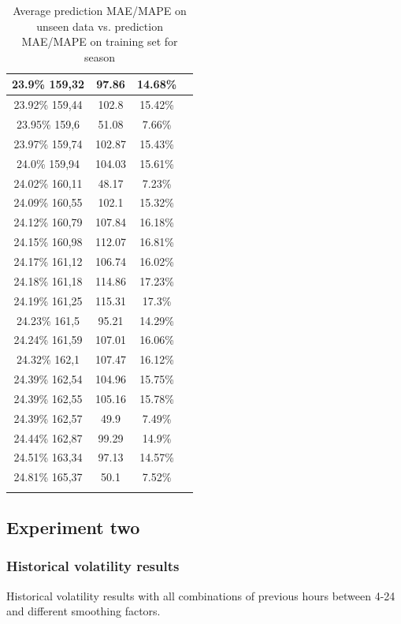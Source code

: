 \begin{center}
\begin{longtable}{|c|c|c|c|}
23.9\% 159,32 & 97.86 & 14.68\%  \\ \hline
23.92\% 159,44 & 102.8 & 15.42\%  \\ \hline
23.95\% 159,6 & 51.08 & 7.66\%  \\ \hline
23.97\% 159,74 & 102.87 & 15.43\%  \\ \hline
24.0\% 159,94 & 104.03 & 15.61\%  \\ \hline
24.02\% 160,11 & 48.17 & 7.23\%  \\ \hline
24.09\% 160,55 & 102.1 & 15.32\%  \\ \hline
24.12\% 160,79 & 107.84 & 16.18\%  \\ \hline
24.15\% 160,98 & 112.07 & 16.81\%  \\ \hline
24.17\% 161,12 & 106.74 & 16.02\%  \\ \hline
24.18\% 161,18 & 114.86 & 17.23\%  \\ \hline
24.19\% 161,25 & 115.31 & 17.3\%  \\ \hline
24.23\% 161,5 & 95.21 & 14.29\%  \\ \hline
24.24\% 161,59 & 107.01 & 16.06\%  \\ \hline
24.32\% 162,1 & 107.47 & 16.12\%  \\ \hline
24.39\% 162,54 & 104.96 & 15.75\%  \\ \hline
24.39\% 162,55 & 105.16 & 15.78\%  \\ \hline
24.39\% 162,57 & 49.9 & 7.49\%  \\ \hline
24.44\% 162,87 & 99.29 & 14.9\%  \\ \hline
24.51\% 163,34 & 97.13 & 14.57\%  \\ \hline
24.81\% 165,37 & 50.1 & 7.52\%  \\ \hline
\caption{Average prediction MAE/MAPE on unseen data vs. prediction MAE/MAPE on training set for season}
\label{table:predictionMAEUnseenVsTrainingSetSeasonAppendix}
\end{longtable}
\end{center}
\normalsize
\subsection{Experiment two}

\subsubsection{Historical volatility results}
\label{sec:historicalVolatiltiyResultsAppendix}
Historical volatility results with all combinations of previous hours between 4-24 and different smoothing factors.

